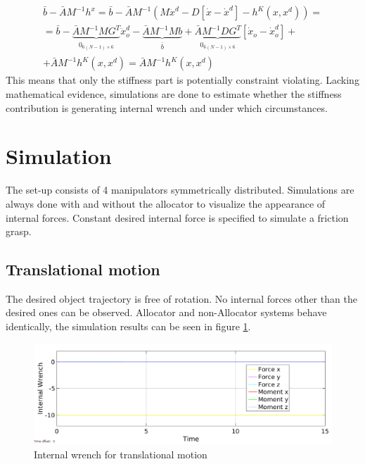 \documentclass[conference]{IEEEtran}
\begin{document}
\begin{multline}
\bar{b} - \bar{A}M^{-1}h^x = \bar{b}-\bar{A}M^{-1}(M\ddot{x}^d - D[\dot{x}-\dot{x}^d] - h^K(x,x^d)) =\\
= \bar{b} - \underbrace{\bar{A}M^{-1}MG^T}_{\substack{0_{6(N-1)\times6}}}\ddot{x}_o^d -\underbrace{\bar{A}M^{-1}Mb}_{\substack{\bar{b}}} + \underbrace{\bar{A}M^{-1}DG^T}_{\substack{0_{6(N-1)\times6}}}[\dot{x}_o - \dot{x}_o^d] + \\
+ \bar{A}M^{-1}h^K(x,x^d) = \bar{A}M^{-1}h^K(x,x^d) 
\end{multline}
This means that only the stiffness part is potentially constraint violating. Lacking mathematical evidence, simulations are done to estimate whether the stiffness contribution is generating internal wrench and under which circumstances. 
\section{Simulation}
The set-up consists of 4 manipulators symmetrically distributed. Simulations are always done with and without the allocator to visualize the appearance of internal forces. Constant desired internal force is specified to simulate a friction grasp.
\subsection{Translational motion}
The desired object trajectory is free of rotation. No internal forces other than the desired ones can be observed. Allocator and non-Allocator systems behave identically, the simulation results can be seen in figure \ref{IntForceAllocator}.
\begin{figure}
\includegraphics[width=\linewidth]{IntForceStepAllocator}
\caption{Internal wrench for translational motion}
\label{IntForceAllocator}
\end{figure}
\end{document}
